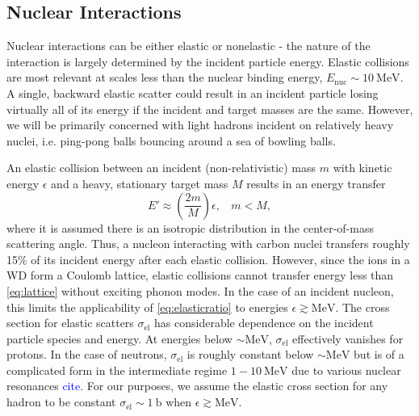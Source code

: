 \documentclass[twocolumn,showpacs,preprintnumbers,amsmath,amssymb,prd]{revtex4}
\def\r{\right)}
\def\l{\left(}
\begin{document}
\begin{appendices}
\subsection*{Nuclear Interactions}
Nuclear interactions can be either elastic or nonelastic - the nature of the interaction is largely determined by the incident particle energy.
Elastic collisions are most relevant at scales less than the nuclear binding energy, $E_\text{nuc} \sim 10 ~\text{MeV}$.
A single, backward elastic scatter could result in an incident particle losing virtually all of its energy if the incident and target masses are the same.
However, we will be primarily concerned with light hadrons incident on relatively heavy nuclei, i.e.
ping-pong balls bouncing around a sea of bowling balls.

An elastic collision between an incident (non-relativistic) mass $m$ with kinetic energy $\epsilon$ and a heavy, stationary target mass $M$ results in an energy transfer
\begin{equation}
\label{eq:elasticratio}
E' \approx \l \frac{2 m}{M}\r \epsilon, ~~~~ m < M,
\end{equation}
where it is assumed there is an isotropic distribution in the center-of-mass scattering angle.
Thus, a nucleon interacting with carbon nuclei transfers roughly 15\% of its incident energy after each elastic collision.
However, since the ions in a WD form a Coulomb lattice, elastic collisions cannot transfer energy less than \eqref{eq:lattice} without exciting phonon modes.
In the case of an incident nucleon, this limits the applicability of \eqref{eq:elasticratio} to energies $\epsilon \gtrsim \text{MeV}$.
The cross section for elastic scatters $\sigma_\text{el}$ has considerable dependence on the incident particle species and energy.
At energies below $\sim \text{MeV}$, $\sigma_\text{el}$ effectively vanishes for protons.
In the case of neutrons, $\sigma_\text{el}$ is roughly constant below $\sim \text{MeV}$ but is of a complicated form in the intermediate regime $1 - 10 ~\text{MeV}$ due to various nuclear resonances \textcolor{blue}{cite}.
For our purposes, we assume the elastic cross section for any hadron to be constant $\sigma_\text{el} \sim 1 ~\text{b}$ when $\epsilon \gtrsim \text{MeV}$.


\end{appendices}
\end{document}
